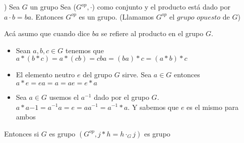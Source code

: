 \documentclass[12pt]{article}
\theoremstyle{definition}
\begin{document}
) Sea $G$ un grupo Sea ($G^{op}, \cdot$) como conjunto y el producto está dado por $a \cdot b = ba$. Entonces $G^{op}$ es un grupo. (Llamamos $G^{op}$ el $grupo$ $opuesto$ de $G$)

Acá asumo que cuando dice $ba$ se refiere al producto en el grupo $G$. 
\begin{itemize}
  \item Sean $a,b,c \in G$ tenemos que $a*(b*c) = a * (cb) = cba = (ba) * c = (a*b)*c$ 
  \item El elemento neutro $e$ del grupo $G$ sirve. Sea $a \in G$ entonces $a*e = ea = a = ae = e*a$ 
  \item Sea $a \in G$ usemos el $a^{-1}$ dado por el grupo $G$. $a*a{-1} = a^{-1}a = e = aa^{-1} = a^{-1}*a$. Y sabemos que $e$ es el mismo para ambos
    
\end{itemize}
Entonces si $G$ es grupo $(G^{op},j*h = h \cdot_{G}j)$ es grupo
\end{document}

